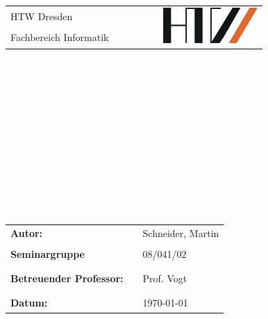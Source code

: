 \thispagestyle{empty}
\begin{center}
\begin{tabular}{lcr}
 \Large{HTW Dresden} & \verb|       |& \multirow{3}{*}{\includegraphics[height=1.353cm]{material/htwlogo.jpg}} \\
 \Large{Fachbereich Informatik} &  & \\
\end{tabular}\end{center}
\begin{center}


\end{center}
\begin{verbatim}


\end{verbatim}
\begin{center}
\textbf{\Huge{\ownTitle}}


\end{center}
\begin{verbatim}



\end{verbatim}
\begin{center}
\textbf{\LARGE{\ownTitleZ}}
\end{center}
\begin{verbatim}








\end{verbatim}
\begin{flushleft}
\begin{tabular}{lll}
\textbf{Autor:} & & Schneider, Martin\\
& & \\
\textbf{Seminargruppe} & & 08/041/02\\
& & \\
& & \\
\textbf{Betreuender Professor:} & & Prof. Vogt\\
& & \\
& & \\
\textbf{Datum:} & & \today\\

\end{tabular}

\end{flushleft}